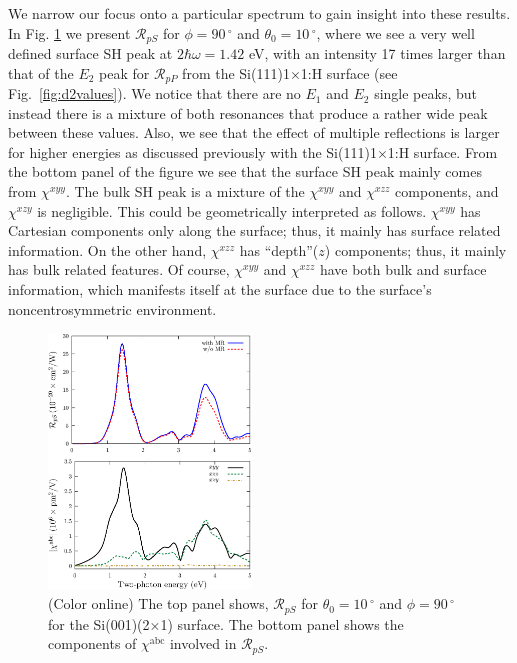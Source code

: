\documentclass[aps,prb,10pt,showpacs,letterpaper,twocolumn]{revtex4-1}
\begin{document}
We narrow our focus onto a particular spectrum to gain insight into these
results. In Fig. \ref{fig:rpsSi2x1} we present $\mathcal{R}_{pS}$ for $\phi =
90\,^{\circ}$ and $\theta_{0} = 10\,^{\circ}$, where we see a very well defined
surface SH peak at $2\hbar\omega = 1.42$ eV, with an intensity 17 times larger
than that of the $E_{2}$ peak for $\mathcal{R}_{pP}$ from the
Si(111)1$\times$1:H surface (see Fig.~\ref{fig:d2values}). We notice that there
are no $E_{1}$ and $E_{2}$ single peaks, but instead there is a mixture of both
resonances that produce a rather wide peak between these values. Also, we see
that the effect of multiple reflections is larger for higher energies as
discussed previously with the Si(111)1$\times$1:H surface. From the bottom panel
of the figure we see that the surface SH peak mainly comes from $\chi^{xyy}$.
The bulk SH peak is a mixture of the $\chi^{xyy}$ and $\chi^{xzz}$ components,
and $\chi^{xzy}$ is negligible. This could be geometrically interpreted as
follows. $\chi^{xyy}$ has Cartesian components only along the surface; thus, it
mainly has surface related information. On the other hand, $\chi^{xzz}$ has
``depth''($z$) components; thus, it mainly has bulk related features. Of course,
$\chi^{xyy}$ and $\chi^{xzz}$ have both bulk and surface information, which
manifests itself at the surface due to the surface's noncentrosymmetric
environment.

\begin{figure}[t]
\includegraphics[width=0.48\textwidth]{figures/fig7}
\caption{(Color online) The top panel shows, $\mathcal{R}_{pS}$ for
$\theta_{0}=10\,^{\circ}$ and $\phi=90\,^{\circ}$ for the Si(001)(2$\times$1)
surface. The bottom panel shows the components of $\chi^{\mathrm{abc}}$ involved
in $\mathcal{R}_{pS}$.}
\label{fig:rpsSi2x1}
\end{figure}
\end{document}
